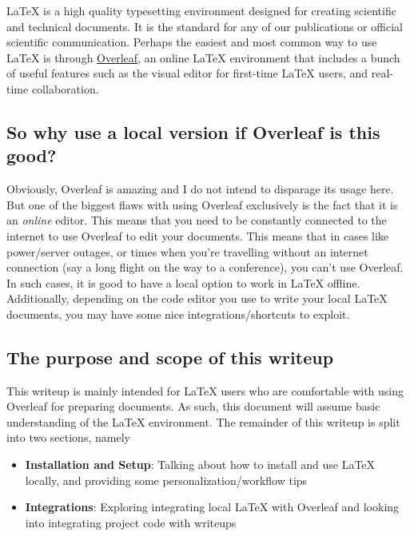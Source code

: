 \graphicspath{{Parts/1_Introductions/graphics/}}

\LaTeX{}{} is a high quality typesetting environment designed for creating scientific and technical documents. It is the standard for any of our publications or official scientific communication. Perhaps the easiest and most common way to use \LaTeX{}{} is through \hyperlink{https://www.overleaf.com}{Overleaf}, an online \LaTeX{} environment that includes a bunch of useful features such as the visual editor for first-time \LaTeX{} users, and real-time collaboration.

\subsection{So why use a local version if Overleaf is this good?}
Obviously, Overleaf is amazing and I do not intend to disparage its usage here. But one of the biggest flaws with using Overleaf exclusively is the fact that it is an \emph{online} editor. This means that you need to be constantly connected to the internet to use Overleaf to edit your documents. This means that in cases like power/server outages, or times when you're travelling without an internet connection (say a long flight on the way to a conference), you can't use Overleaf. In such cases, it is good to have a local option to work in \LaTeX{} offline. Additionally, depending on the code editor you use to write your local \LaTeX{} documents, you may have some nice integrations/shortcuts to exploit.

\subsection{The purpose and scope of this writeup}
This writeup is mainly intended for \LaTeX{} users who are comfortable with using Overleaf for preparing documents. As such, this document will assume basic understanding of the \LaTeX{} environment. The remainder of this writeup is split into two sections, namely
\begin{itemize}
    \item \textbf{Installation and Setup}: Talking about how to install and use \LaTeX{} locally, and providing some personalization/workflow tips
    \item \textbf{Integrations}: Exploring integrating local \LaTeX{} with Overleaf and looking into integrating project code with writeups
\end{itemize}


%



    